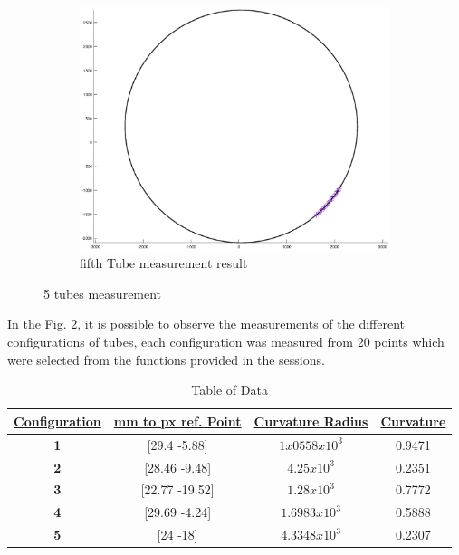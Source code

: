 \documentclass[12pt, twoside]{report}
\begin{document}
\begin{figure}[H]
\begin{subfigure}[b]{0.4\textwidth}
         \centering
         \includegraphics[width=\textwidth]{TP_1/curve5.eps}
         \caption{fifth Tube measurement result}
         \label{fig:Tube5}
     \end{subfigure}
        \caption{5 tubes measurement}
        \label{fig:tubes}
\end{figure}
In the Fig. \ref{fig:tubes}, it is possible to observe the measurements of the different configurations of tubes, each configuration was measured from 20 points which were selected from the functions provided in the sessions.
\begin{table}[H]
\caption{Table of Data}
\begin{tabular}{|c|c|c|c|}
\hline 
{\ul \textbf{Configuration}} & {\ul \textbf{mm to px ref. Point}} & {\ul \textbf{Curvature Radius}} & {\ul \textbf{Curvature}} \\ \hline
\textbf{1}                   & {[}29.4 -5.88{]}                   & $1x0558x10^3$                   & 0.9471                   \\ \hline
\textbf{2}                   & {[}28.46 -9.48{]}                  & $4.25x10^3$                     & 0.2351                   \\ \hline
\textbf{3}                   &  {[}22.77 -19.52{]}                              &     $1.28x10^3$                            &                 0.7772    \\ \hline
\textbf{4}                   & {[}29.69 -4.24{]}                                   &      $1.6983x10^3$                     &          0.5888           \\ \hline
\textbf{5}                   & {[}24 -18{]}                 &   $4.3348x10^3$           & 0.2307                         \\ \hline
\end{tabular}
\end{table}
\end{document}
